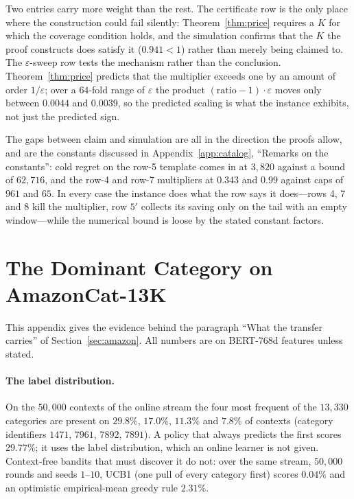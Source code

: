 \documentclass{article}
\theoremstyle{definition}
\theoremstyle{remark}
\newcommand{\eps}{\varepsilon}
\theoremstyle{remark}
\begin{document}
Two entries carry more weight than the rest. The certificate row is the only
place where the construction could fail silently: Theorem~\ref{thm:price}
requires a $K$ for which the coverage condition holds, and the simulation
confirms that the $K$ the proof constructs does satisfy it
($0.941<1$) rather than merely being claimed to. The $\eps$-sweep row tests the
mechanism rather than the conclusion. Theorem~\ref{thm:price} predicts that
the multiplier exceeds one by an amount of order $1/\eps$; over a $64$-fold
range of $\eps$ the product $(\text{ratio}-1)\cdot\eps$ moves only between
$0.0044$ and $0.0039$, so the predicted scaling is what the instance exhibits,
not just the predicted sign.

The gaps between claim and simulation are all in the direction the proofs
allow, and are the constants discussed in
Appendix~\ref{app:catalog}, ``Remarks on the constants'': cold regret on the
row-5 template comes in at $3{,}820$ against a bound of $62{,}716$, and the
row-4 and row-7 multipliers at $0.343$ and $0.99$ against caps of $961$ and
$65$. In every case the instance does what the row says it does---rows 4, 7
and 8 kill the multiplier, row $5'$ collects its saving only on the tail with
an empty window---while the numerical bound is loose by the stated constant
factors.

\section{The Dominant Category on AmazonCat-13K}
\label{app:dominant}

This appendix gives the evidence behind the paragraph ``What the transfer
carries'' of Section~\ref{sec:amazon}. All numbers are on BERT-768d features
unless stated.

\paragraph{The label distribution.}
On the $50{,}000$ contexts of the online stream the four most frequent of the
$13{,}330$ categories are present on $29.8\%$, $17.0\%$, $11.3\%$ and $7.8\%$
of contexts (category identifiers $1471$, $7961$, $7892$, $7891$). A policy
that always predicts the first scores $29.77\%$; it uses the label
distribution, which an online learner is not given. Context-free bandits that
must discover it do not: over the same stream, $50{,}000$ rounds and seeds
$1$--$10$, UCB1 (one pull of every category first) scores $0.04\%$ and an
optimistic empirical-mean greedy rule $2.31\%$.
\end{document}
